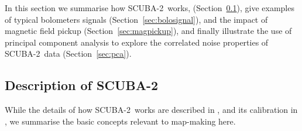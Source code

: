 \documentclass[useAMS,usenatbib,nofootinbib]{mn2e}
\newcommand{\scuba}{SCUBA-2}
\begin{document}
In this section we summarise how \scuba\ works,
(Section~\ref{sec:bolos}), give examples of typical bolometers signals
(Section~\ref{sec:bolosignal}), and the impact of magnetic field
pickup (Section~\ref{sec:magpickup}), and finally illustrate the use
of principal component analysis to explore the correlated noise
properties of \scuba\ data (Section~\ref{sec:pca}).

\subsection{Description of \scuba}
\label{sec:bolos}

While the details of how \scuba\ works are described in
\citet{holland2012}, and its calibration in \citet{dempsey2012}, we
summarise the basic concepts relevant to map-making here.
\end{document}
